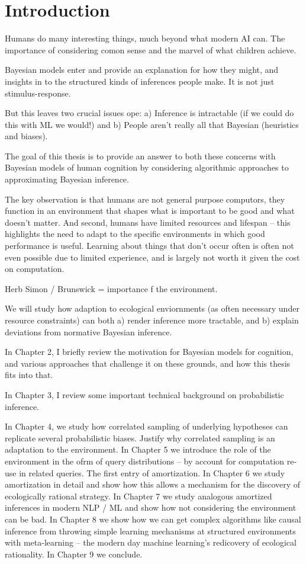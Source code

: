 \chapter{Introduction}
\label{introduction}


Humans do many interesting things, much beyond what modern AI can.  The importance of considering comon sense and the marvel of what children achieve.

Bayesian models enter and provide an explanation for how they might, and insights in to the structured kinds of inferences people make. It is not just stimulus-response.

But this leaves two crucial issues ope: a) Inference is intractable (if we could do this with ML we would!) and b) People aren't really all that Bayesian (heuristics and biases). 

The goal of this thesis is to provide an answer to both these concerns with Bayesian models of human cognition by considering algorithmic approaches to approximating Bayesian inference.

The key observation is that humans are not general purpose computors, they function in an environment that shapes what is important to be good and what doesn't matter. And second, humans have limited resources and lifespan -- this highlights the need to adapt to the specific environments in which good performance is useful. Learning about things that don't occur often is often not even possible due to limited experience, and is largely not worth it given the cost on computation. 

Herb Simon / Brunswick = importance f the environment.

We will study how adaption to ecological enviornments (as often necessary under resource constraints) can both a) render inference more tractable, and b) explain deviations from normative Bayesian inference.

In Chapter 2, I briefly review the motivation for Bayesian models for cognition, and various approaches that challenge it on these grounds, and how this thesis fits into that.

In Chapter 3, I review some important technical background on probabilistic inference.

In Chapter 4, we study how correlated sampling of underlying hypotheses can replicate several probabilistic biases. Justify why correlated sampling is an adaptation to the environment. In Chapter 5 we introduce the role of the environment in the ofrm of query distributions -- by account for computation re-use in related queries. The first entry of amortization. In Chapter 6 we study amortization in detail and show how this allows a mechanism for the discovery of ecologically rational strategy. In Chapter 7 we study analogous amortized inferences in modern NLP / ML and show how not considering the environment can be bad. In Chapter 8 we show how we can get complex algorithms like causal inference from throwing simple learning mechanisms at structured environments with meta-learning -- the modern day machine learning's redicovery of ecological rationality. In Chapter 9 we conclude.

